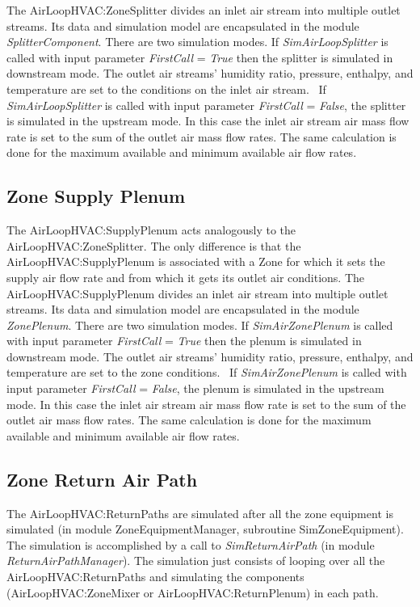 The AirLoopHVAC:ZoneSplitter divides an inlet air stream into multiple outlet streams. Its data and simulation model are encapsulated in the module \emph{SplitterComponent}. There are two simulation modes. If \emph{SimAirLoopSplitter} is called with input parameter \emph{FirstCall} = \emph{True} then the splitter is simulated in downstream mode. The outlet air streams' humidity ratio, pressure, enthalpy, and temperature are set to the conditions on the inlet air stream.~ If \emph{SimAirLoopSplitter} is called with input parameter \emph{FirstCall} = \emph{False}, the splitter is simulated in the upstream mode. In this case the inlet air stream air mass flow rate is set to the sum of the outlet air mass flow rates. The same calculation is done for the maximum available and minimum available air flow rates.

\subsection{Zone Supply Plenum}\label{zone-supply-plenum}

The AirLoopHVAC:SupplyPlenum acts analogously to the AirLoopHVAC:ZoneSplitter. The only difference is that the AirLoopHVAC:SupplyPlenum is associated with a Zone for which it sets the supply air flow rate and from which it gets its outlet air conditions. The AirLoopHVAC:SupplyPlenum divides an inlet air stream into multiple outlet streams. Its data and simulation model are encapsulated in the module \emph{ZonePlenum}. There are two simulation modes. If \emph{SimAirZonePlenum} is called with input parameter \emph{FirstCall} = \emph{True} then the plenum is simulated in downstream mode. The outlet air streams' humidity ratio, pressure, enthalpy, and temperature are set to the zone conditions.~ If \emph{SimAirZonePlenum} is called with input parameter \emph{FirstCall} = \emph{False}, the plenum is simulated in the upstream mode. In this case the inlet air stream air mass flow rate is set to the sum of the outlet air mass flow rates. The same calculation is done for the maximum available and minimum available air flow rates.

\subsection{Zone Return Air Path}\label{zone-return-air-path}

The AirLoopHVAC:ReturnPaths are simulated after all the zone equipment is simulated (in module ZoneEquipmentManager, subroutine SimZoneEquipment). The simulation is accomplished by a call to \emph{SimReturnAirPath} (in module \emph{ReturnAirPathManager}). The simulation just consists of looping over all the AirLoopHVAC:ReturnPaths and simulating the components (AirLoopHVAC:ZoneMixer or AirLoopHVAC:ReturnPlenum) in each path.

